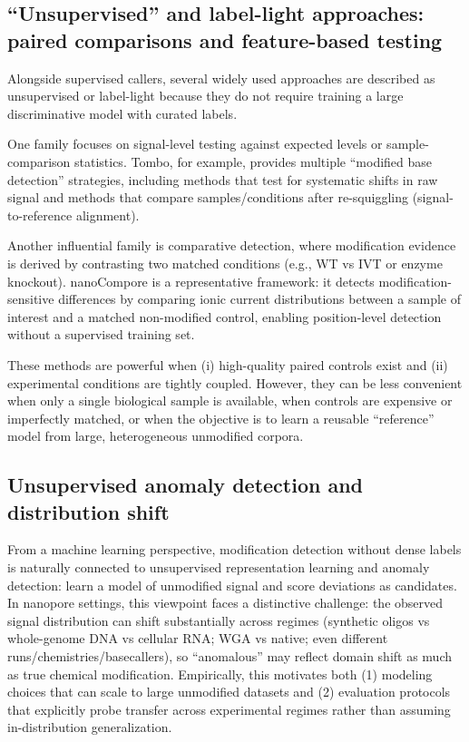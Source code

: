 \documentclass[journal,article,submit,pdftex,moreauthors]{Definitions/mdpi}
\begin{document}
\subsection{“Unsupervised” and label-light approaches: paired comparisons and feature-based testing}
Alongside supervised callers, several widely used approaches are described as unsupervised or label-light because they do not require training a large discriminative model with curated labels.

One family focuses on signal-level testing against expected levels or sample-comparison statistics. Tombo\cite{ref7}, for example, provides multiple “modified base detection” strategies, including methods that test for systematic shifts in raw signal and methods that compare samples/conditions after re-squiggling (signal-to-reference alignment).

Another influential family is comparative detection, where modification evidence is derived by contrasting two matched conditions (e.g., WT vs IVT or enzyme knockout). nanoCompore\cite{ref8} is a representative framework: it detects modification-sensitive differences by comparing ionic current distributions between a sample of interest and a matched non-modified control, enabling position-level detection without a supervised training set.

These methods are powerful when (i) high-quality paired controls exist and (ii) experimental conditions are tightly coupled. However, they can be less convenient when only a single biological sample is available, when controls are expensive or imperfectly matched, or when the objective is to learn a reusable “reference” model from large, heterogeneous unmodified corpora.

\subsection{Unsupervised anomaly detection and distribution shift}
From a machine learning perspective, modification detection without dense labels is naturally connected to unsupervised representation learning and anomaly detection: learn a model of unmodified signal and score deviations as candidates. In nanopore settings, this viewpoint faces a distinctive challenge: the observed signal distribution can shift substantially across regimes (synthetic oligos vs whole-genome DNA vs cellular RNA; WGA vs native; even different runs/chemistries/basecallers), so “anomalous” may reflect domain shift as much as true chemical modification. Empirically, this motivates both (1) modeling choices that can scale to large unmodified datasets and (2) evaluation protocols that explicitly probe transfer across experimental regimes rather than assuming in-distribution generalization.
\end{document}
